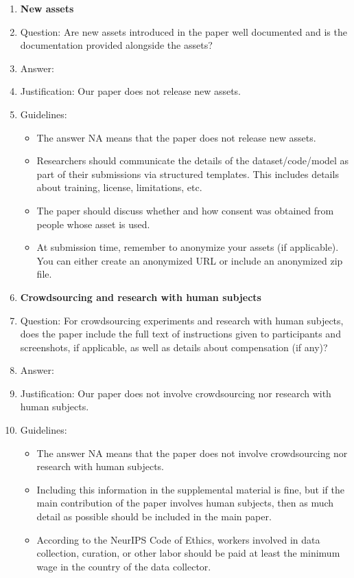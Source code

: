 \documentclass{article}
\theoremstyle{remark}
\begin{document}
\begin{enumerate}
\item {\bf New assets}
    \item[] Question: Are new assets introduced in the paper well documented and is the documentation provided alongside the assets?
    \item[] Answer: \answerNA{} %
    \item[] Justification: Our paper does not release new assets.
    \item[] Guidelines:
    \begin{itemize}
        \item The answer NA means that the paper does not release new assets.
        \item Researchers should communicate the details of the dataset/code/model as part of their submissions via structured templates. This includes details about training, license, limitations, etc. 
        \item The paper should discuss whether and how consent was obtained from people whose asset is used.
        \item At submission time, remember to anonymize your assets (if applicable). You can either create an anonymized URL or include an anonymized zip file.
    \end{itemize}

\item {\bf Crowdsourcing and research with human subjects}
    \item[] Question: For crowdsourcing experiments and research with human subjects, does the paper include the full text of instructions given to participants and screenshots, if applicable, as well as details about compensation (if any)? 
    \item[] Answer: \answerNA{} %
    \item[] Justification: Our paper does not involve crowdsourcing nor research with human subjects.
    \item[] Guidelines:
    \begin{itemize}
        \item The answer NA means that the paper does not involve crowdsourcing nor research with human subjects.
        \item Including this information in the supplemental material is fine, but if the main contribution of the paper involves human subjects, then as much detail as possible should be included in the main paper. 
        \item According to the NeurIPS Code of Ethics, workers involved in data collection, curation, or other labor should be paid at least the minimum wage in the country of the data collector. 
    \end{itemize}


\end{enumerate}
\end{document}
